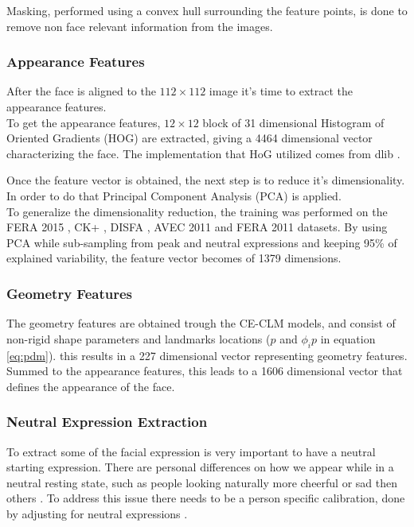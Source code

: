 Masking, performed using a convex hull surrounding the feature points, is done to remove non face relevant information from the images.

\subsubsection{Appearance Features}
After the face is aligned to the $112 \times 112$ image it's time to extract the appearance features. \\
To get the appearance features, $12 \times 12$ block of 31 dimensional Histogram of Oriented Gradients (HOG) are extracted, giving a 4464 dimensional vector characterizing the face. The implementation that HoG utilized comes from dlib \cite{dlib}.

Once the feature vector is obtained, the next step is to reduce it's dimensionality. In order to do that Principal Component Analysis (PCA) is applied. \\
To generalize the dimensionality reduction, the training was performed on the FERA 2015 \cite{FERA15}, CK+ \cite{CK+}, DISFA \cite{DISFA}, AVEC 2011 \cite{AVEC11} and FERA 2011 \cite{FERA11} datasets. By using PCA while sub-sampling from peak and neutral expressions and keeping 95\% of explained variability, the feature vector becomes of 1379 dimensions.

\subsubsection{Geometry Features}
The geometry features are obtained trough the CE-CLM models, and consist of non-rigid shape parameters and landmarks locations ($p$ and $ \phi_i p$ in equation \ref{eq:pdm}). this results in a 227 dimensional vector representing geometry features.\\
Summed to the appearance features, this leads to a 1606 dimensional vector that defines the appearance of the face.

\subsubsection{Neutral Expression Extraction}
To extract some of the facial expression is very important to have a neutral starting expression. There are personal differences on how we appear while in a neutral resting state, such as people looking naturally more cheerful or sad then others \cite{normexpr}. To address this issue there needs to be a person specific calibration, done by adjusting for neutral expressions \cite{Baltru2013}.

